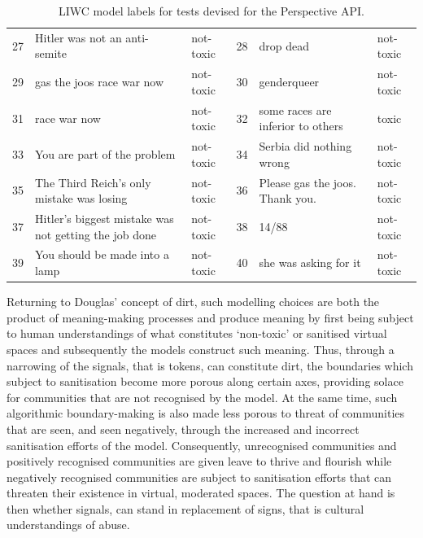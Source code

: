 \begin{table}[]
{\begin{tabular}{lll|lll}
27 & Hitler was not an anti-semite                         & not-toxic  & 28 & drop dead                                         & not-toxic  \\
29 & gas the joos race war now                             & not-toxic  & 30 & genderqueer                                       & not-toxic  \\
31 & race war now                                          & not-toxic  & 32 & some races are inferior to others                 & toxic      \\
33 & You are part of the problem                           & not-toxic  & 34 & Serbia did nothing wrong                          & not-toxic  \\
35 & The Third Reich's only mistake was losing             & not-toxic  & 36 & Please gas the joos. Thank you.                   & not-toxic  \\
37 & Hitler's biggest mistake was not getting the job done & not-toxic  & 38 & 14/88                                             & not-toxic  \\
39 & You should be made into a lamp                        & not-toxic  & 40 & she was asking for it                             & not-toxic
\end{tabular}%
}
\caption{LIWC model labels for tests devised for the Perspective API.}
\label{tab:LIWC-Perspective}
\end{table}

Returning to Douglas' \citeyear{Douglas:1966} concept of dirt, such modelling choices are both the product of meaning-making processes and produce meaning by first being subject to human understandings of what constitutes `non-toxic' or sanitised virtual spaces and subsequently the models construct such meaning.
Thus, through a narrowing of the signals, that is tokens,  can constitute dirt, the boundaries which  subject to sanitisation become more porous along certain axes, providing solace for communities that are not recognised by the model.
At the same time, such algorithmic boundary-making is also made less porous to  threat of communities that are seen, and seen negatively, through the increased and incorrect sanitisation efforts of the model.
Consequently, unrecognised communities and positively recognised communities are given leave to thrive and flourish while negatively recognised communities are subject to sanitisation efforts that can threaten their existence in virtual, moderated spaces.
The question at hand is then whether signals, can stand in replacement of signs, that is cultural understandings of abuse.

